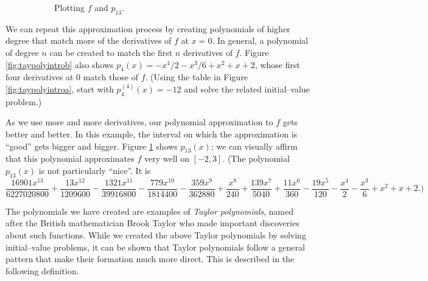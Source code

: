 \begin{figure}
\begin{subfigure}[t]{0.5\textwidth}
        \label{fig:taypolyintroc}
        \caption{Plotting $f$ and $p_{13}$.}    
    \end{subfigure} 
    \caption{ \label{fig:taypolyintrobc}}
\end{figure}






We can repeat this approximation process by creating polynomials of higher degree that match more of the derivatives of $f$ at $x=0$. In general, a polynomial of degree $n$ can be created to match the first $n$ derivatives of $f$. Figure \ref{fig:taypolyintrob} also shows $p_4(x)= -x^4/2-x^3/6+x^2+x+2$, whose first four derivatives at 0 match those of $f$. (Using the table in Figure \ref{fig:taypolyintroa}, start with $p_4^{(4)}(x)=-12$ and solve the related initial--value problem.)

As we use more and more derivatives, our polynomial approximation to $f$ gets better and better. In this example, the interval on which the approximation is ``good'' gets bigger and bigger. Figure \ref{fig:taypolyintroc} shows $p_{13}(x)$; we can visually affirm that this polynomial approximates $f$ very well on $[-2,3]$. (The polynomial $p_{13}(x)$ is not particularly ``nice''. It is {\scriptsize $$ \frac{16901x^{13}}{6227020800}+\frac{13x^{12}}{1209600}-\frac{1321x^{11}}{39916800}-\frac{779x^{10}}{1814400}-\frac{359x^9}{362880}+\frac{x^8}{240}+\frac{139x^7}{5040}+\frac{11 x^6}{360}-\frac{19x^5}{120}-\frac{x^4}{2}-\frac{x^3}{6}+x^2+x+2.)$$}

The polynomials we have created are examples of \emph{Taylor polynomials}, named after the British mathematician Brook Taylor who made important discoveries about such functions. While we created the above Taylor polynomials by solving initial--value problems, it can be shown that Taylor polynomials follow a general pattern that make their formation much more direct. This is described in the following definition.



